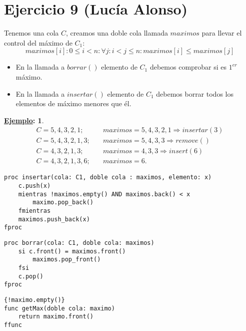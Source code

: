 \documentclass[10pt,a4paper,openright]{book}
\theoremstyle{break}
\newtheorem*{ej}{\underline{Ejemplo}:}
\begin{document}
\section{Ejercicio 9 (Lucía Alonso)}%
\label{sec:ejercicio_9_lucia_alonso_}
Tenemos una cola $C$, creamos una doble cola llamada $maximos$ para llevar el control del máximo de $C_1$: 
\[
    maximos[i]: 0 \le i < n : \forall j : i < j \le n: maximos[i] \le maximos[j]
\]
\begin{itemize}
    \item En la llamada a $borrar\left( \right)$ elemento de $C_1$ debemos comprobar si es $1^{er}$ máximo.
    \item En la llamada a $insertar\left( \right)$ elemento de $C_1$ debemos borrar todos los elementos de máximo menores que él.
\end{itemize}
\begin{ej}
\begin{align*}
    C = 5, 4, 3, 2, 1;&\quad maximos = 5, 4, 3, 2, 1 \Rightarrow insertar\left( 3 \right)\\
    C = 5, 4, 3, 2, 1, 3;&\quad maximos = 5, 4, 3, 3 \Rightarrow remove\left(\right)\\
    C = 4, 3, 2, 1, 3;&\quad maximos = 4, 3, 3 \Rightarrow insert\left( 6 \right)\\
    C = 4, 3, 2, 1, 3, 6;&\quad maximos = 6
.\end{align*}
\end{ej}
\begin{lstlisting}
proc insertar(cola: C1, doble cola : maximos, elemento: x)
    c.push(x)
    mientras !maximos.empty() AND maximos.back() < x 
        maximo.pop_back()
    fmientras
    maximos.push_back(x)
fproc
\end{lstlisting}

\begin{lstlisting}
proc borrar(cola: C1, doble cola: maximos) 
    si c.front() = maximos.front()
        maximos.pop_front()
    fsi
    c.pop()
fproc
\end{lstlisting}

\begin{lstlisting}
{!maximo.empty()}
func getMax(doble cola: maximo)
    return maximo.front()
ffunc
\end{lstlisting}
\end{document}

